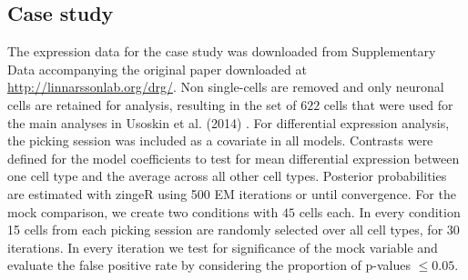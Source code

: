 \documentclass{bmcart}
\newcommand{\review}[1]{\textcolor{black}{#1}}
\begin{document}
\subsection*{Case study}
The expression data for the case study was downloaded from Supplementary Data accompanying the original paper downloaded at \url{http://linnarssonlab.org/drg/}. Non single-cells are removed and only neuronal cells are retained for analysis, resulting in the set of $622$ cells that were used for the main analyses in Usoskin et al. (2014) \cite{Usoskin2014}. 
For differential expression analysis, the picking session was included as a covariate in all models.
Contrasts were defined for the model coefficients to test for mean differential expression between one cell type and the average across all other cell types. Posterior probabilities are estimated with zingeR using 500 EM iterations or until convergence.
For the mock comparison, we create two conditions with $45$ cells each. In every condition 15 cells from each picking session are randomly selected over all cell types, for 30 iterations. In every iteration we test for significance of the mock variable and evaluate the false positive rate by considering the proportion of p-values $\le 0.05$.
\end{document}
